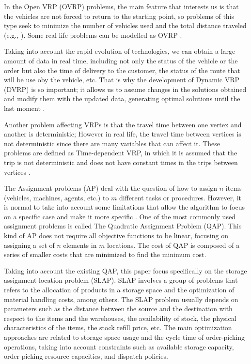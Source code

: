\documentclass[letterpaper]{article} %
\begin{document}
In the Open VRP (OVRP) problems, the main feature that interests us is that the vehicles are not forced to return to the starting point, so problems of this type seek to minimize the number of vehicles used and the total distance traveled (e.g., \cite{Subramanian2013,Cao2014}). Some real life problems can be modelled as OVRP \cite{Lopez-Sanchez2014,Salari2010}.

Taking into account the rapid evolution of technologies, we can obtain a large amount of data in real time, including not only the status of the vehicle or the order but also the time of delivery to the customer, the status of the route that will be use oby the vehicle, etc. That is why the development of Dynamic VRP (DVRP) is so important; it allows us to assume changes in the solutions obtained and modify them with the updated data, generating optimal solutions until the last moment \cite{Barkaoui2013,Pillac2013}.

Another problem affecting VRPs is that the travel time between one vertex and another is deterministic; However in real life, the travel time between vertices is not deterministic since there are many variables that can affect it. These problems are defined as Time-dependent VRP, in which it is assumed that the trip is not deterministic and does not have constant times in the trips between vertices \cite{Li2012}.

\quad

The Assignment problems (AP) deal with the question of how to assign $n$ items (vehicles, machines, agents, etc.) to $m$ different tasks or procedures. However, it is normal to take into account some limitations that allow the algorithm to focus on a specific case and make it more specific \cite{Burkard2009}. One of the most commonly used assignment problems is called The Quadratic Assignment Problem (QAP). This kind of AP does not require all objective functions to be linear, focusing on assigning a set of $n$ elements in $m$ locations. The cost of QAP is composed of a series of smaller costs that are minimized to find the minimum cost.

Taking into account the existing QAP, this paper focus specifically on the storage assignment location problem (SLAP). SLAP involves a group of problems that refers to the allocation of products in a storage space and the optimization of material handling costs, among others. The SLAP problem usually depends on parameters such as the distance between the source and the destination with respect to the items and the warehouses, the availability of stock, the physical characteristics of the items, the stock refill price, etc. The main optimization approaches are related to storage space usage and the cycle time of order-picking operations, taking into account constraints such as available storage capacity, order picking resource capacities, and dispatch policies. \cite{Syed-abdullah2018}
\end{document}
